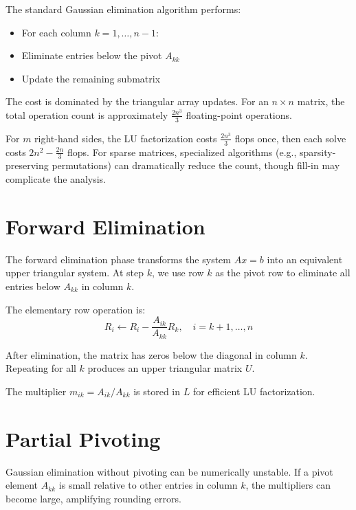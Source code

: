 The standard Gaussian elimination algorithm performs:
\begin{itemize}
    \item For each column $k = 1, \ldots, n-1$:
    \item Eliminate entries below the pivot $A_{kk}$
    \item Update the remaining submatrix
\end{itemize}

The cost is dominated by the triangular array updates. For an $n \times n$ matrix, the total operation count is approximately $\frac{2n^3}{3}$ floating-point operations.

For $m$ right-hand sides, the LU factorization costs $\frac{2n^3}{3}$ flops once, then each solve costs $2n^2 - \frac{2n}{3}$ flops. For sparse matrices, specialized algorithms (e.g., sparsity-preserving permutations) can dramatically reduce the count, though fill-in may complicate the analysis.

\section{Forward Elimination}

The forward elimination phase transforms the system $Ax = b$ into an equivalent upper triangular system. At step $k$, we use row $k$ as the pivot row to eliminate all entries below $A_{kk}$ in column $k$.

The elementary row operation is:
\[
R_i \leftarrow R_i - \frac{A_{ik}}{A_{kk}} R_k, \quad i = k+1, \ldots, n
\]

After elimination, the matrix has zeros below the diagonal in column $k$. Repeating for all $k$ produces an upper triangular matrix $U$.

\begin{definition}
The multiplier $m_{ik} = A_{ik}/A_{kk}$ is stored in $L$ for efficient LU factorization.
\end{definition}

\section{Partial Pivoting}

Gaussian elimination without pivoting can be numerically unstable. If a pivot element $A_{kk}$ is small relative to other entries in column $k$, the multipliers can become large, amplifying rounding errors.


